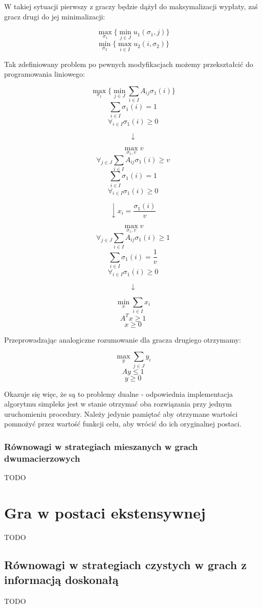 \documentclass{standalone}
\begin{document}
W takiej sytuacji pierwszy z graczy będzie dążył do maksymalizacji wypłaty, zaś gracz drugi do jej minimalizacji:

$$\max_{\sigma_1} \{ \min_{j \in J} u_1(\sigma_1, j) \}$$
$$\min_{\sigma_2} \{ \max_{i \in I} u_2(i, \sigma_2) \}$$

Tak zdefiniowany problem po pewnych modyfikacjach możemy przekształcić do programowania liniowego:

$$\max_{\sigma_1} \{ \min_{j \in J} \sum_{i \in I} A_{ij} \sigma_1(i) \}$$
$$\sum_{i \in I} \sigma_1(i) = 1$$
$$\forall_{i \in I} \sigma_1(i) \geq 0$$

$$\downarrow$$

$$\max_{\sigma_1,v} v$$
$$\forall_{j \in J} \sum_{i \in I} A_{ij} \sigma_1(i) \geq v$$
$$\sum_{i \in I} \sigma_1(i) = 1$$
$$\forall_{i \in I} \sigma_1(i) \geq 0$$

$$\downarrow x_i = \frac{\sigma_1(i)}{v}$$

$$\max_{\sigma_1,v} v$$
$$\forall_{j \in J} \sum_{i \in I} A_{ij} \sigma_1(i) \geq 1$$
$$\sum_{i \in I} \sigma_1(i) = \frac{1}{v}$$
$$\forall_{i \in I} \sigma_1(i) \geq 0$$

$$\downarrow$$

$$\min_x \sum_{i \in I} x_i$$
$$A^Tx \geq 1$$
$$x \geq 0$$

Przeprowadzając analogiczne rozumowanie dla gracza drugiego otrzymamy:

$$\max_y \sum_{j \in J} y_i$$
$$Ay \leq 1$$
$$y \geq 0$$

Okazuje się więc, że są to problemy dualne - odpowiednia implementacja algorytmu simpleks jest w stanie otrzymać oba rozwiązania
przy jednym uruchomieniu procedury. Należy jedynie pamiętać aby otrzymane wartości pomnożyć przez wartość funkcji celu, aby wrócić
do ich oryginalnej postaci.

\subsubsection{Równowagi w strategiach mieszanych w grach dwumacierzowych}

TODO

\section{Gra w postaci ekstensywnej}

TODO

\subsection{Równowagi w strategiach czystych w grach z informacją doskonałą}

TODO
\end{document}
